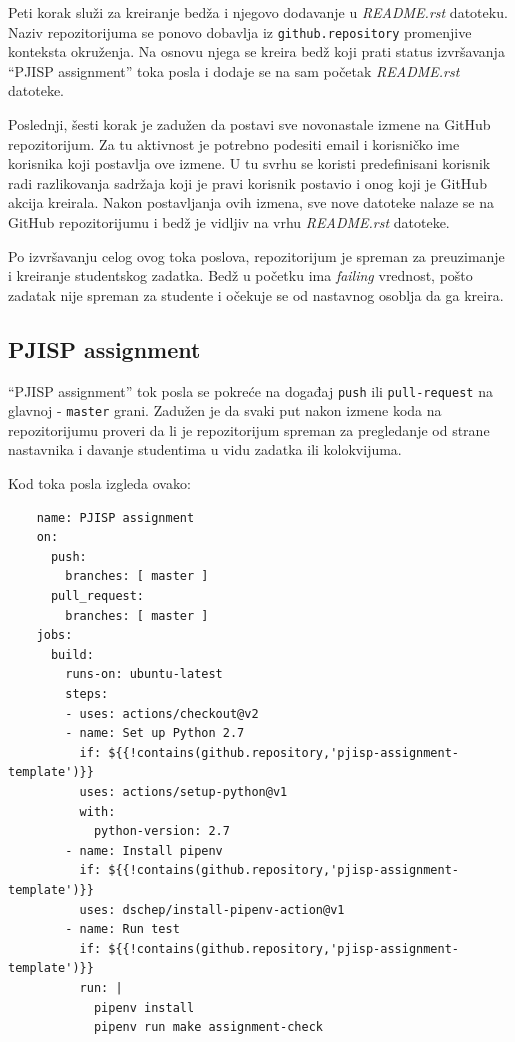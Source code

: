 \documentclass[12pt]{report}
\begin{document}
Peti korak služi za kreiranje bedža i njegovo dodavanje u \textit{README.rst} datoteku. Naziv repozitorijuma se ponovo dobavlja iz \texttt{github.repository} promenjive konteksta okruženja. Na osnovu njega se kreira bedž koji prati status izvršavanja ``PJISP assignment'' toka posla i dodaje se na sam početak \textit{README.rst} datoteke.

Poslednji, šesti korak je zadužen da postavi sve novonastale izmene na GitHub repozitorijum. Za tu aktivnost je potrebno podesiti email i korisničko ime korisnika koji postavlja ove izmene. U tu svrhu se koristi predefinisani korisnik radi razlikovanja sadržaja koji je pravi korisnik postavio i onog koji je GitHub akcija kreirala. Nakon postavljanja ovih izmena, sve nove datoteke nalaze se na GitHub repozitorijumu i bedž je vidljiv na vrhu \textit{README.rst} datoteke.

Po izvršavanju celog ovog toka poslova, repozitorijum je spreman za preuzimanje i kreiranje studentskog zadatka. Bedž u početku ima \textit{failing} vrednost, pošto zadatak nije spreman za studente i očekuje se od nastavnog osoblja da ga kreira.

\subsection{PJISP assignment}
``PJISP assignment'' tok posla se pokreće na događaj \texttt{push} ili \texttt{pull-request} na glavnoj - \texttt{master} grani. Zadužen je da svaki put nakon izmene koda na repozitorijumu proveri da li je repozitorijum spreman za pregledanje od strane nastavnika i davanje studentima u vidu zadatka ili kolokvijuma.

Kod toka posla izgleda ovako:

\begin{verbatim}
    name: PJISP assignment
    on:
      push:
        branches: [ master ]
      pull_request:
        branches: [ master ]
    jobs:
      build:
        runs-on: ubuntu-latest
        steps:
        - uses: actions/checkout@v2
        - name: Set up Python 2.7
          if: ${{!contains(github.repository,'pjisp-assignment-template')}}
          uses: actions/setup-python@v1
          with:
            python-version: 2.7
        - name: Install pipenv
          if: ${{!contains(github.repository,'pjisp-assignment-template')}}
          uses: dschep/install-pipenv-action@v1
        - name: Run test
          if: ${{!contains(github.repository,'pjisp-assignment-template')}}
          run: |
            pipenv install
            pipenv run make assignment-check
\end{verbatim}
\end{document}
